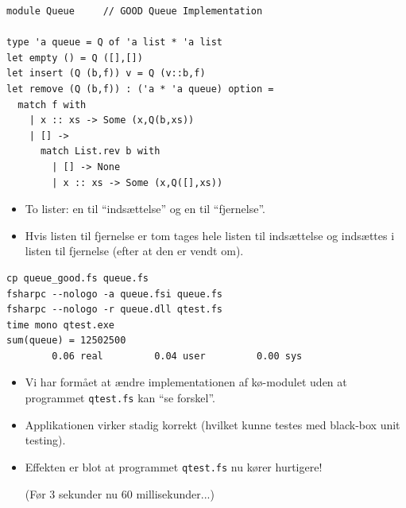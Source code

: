 \documentclass[rgb]{beamer}
\begin{document}
\begin{frame}[fragile]
\begin{footnotesize}


  \vspace{1ex}

\begin{lstlisting}[numbers=none,frame=none,mathescape]
module Queue     // GOOD Queue Implementation

type 'a queue = Q of 'a list * 'a list
let empty () = Q ([],[])
let insert (Q (b,f)) v = Q (v::b,f)
let remove (Q (b,f)) : ('a * 'a queue) option =
  match f with
    | x :: xs -> Some (x,Q(b,xs))
    | [] ->
      match List.rev b with
        | [] -> None
        | x :: xs -> Some (x,Q([],xs))
\end{lstlisting}

  \vspace{1ex}
\begin{itemize}
\item To lister: en til ``indsættelse'' og en til ``fjernelse''.
\item Hvis listen til fjernelse er tom tages hele listen til
  indsættelse og indsættes i listen til fjernelse (efter at den er
  vendt om).
\end{itemize}

\end{footnotesize}
\end{frame}

\begin{frame}[fragile]
\begin{footnotesize}

  \vspace{1ex}

\begin{verbatim}
cp queue_good.fs queue.fs
fsharpc --nologo -a queue.fsi queue.fs
fsharpc --nologo -r queue.dll qtest.fs
time mono qtest.exe
sum(queue) = 12502500
        0.06 real         0.04 user         0.00 sys
\end{verbatim}

  \vspace{1ex}
\begin{itemize}
\item Vi har formået at ændre implementationen af kø-modulet uden at programmet \texttt{qtest.fs} kan ``se forskel''.
\item Applikationen virker stadig korrekt (hvilket kunne testes med black-box unit testing).
\item Effekten er blot at programmet \texttt{qtest.fs} nu kører hurtigere!

  (Før 3 sekunder nu 60 millisekunder...)
\end{itemize}

\end{footnotesize}
\end{frame}
\end{document}

